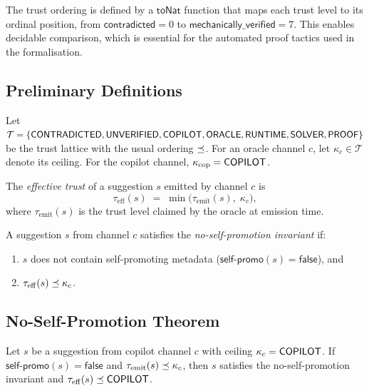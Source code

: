 \documentclass[11pt]{article}
\newcommand{\selfpromo}{\mathsf{self\text{-}promo}}
\begin{document}
The trust ordering is defined by a $\mathsf{toNat}$ function that
maps each trust level to its ordinal position, from
$\mathsf{contradicted} = 0$ to
$\mathsf{mechanically\_verified} = 7$.  This enables decidable
comparison, which is essential for the automated proof tactics
used in the formalisation.

\subsection{Preliminary Definitions}\label{sec:formal-prelim}

Let $\mathcal{T} = \{\mathsf{CONTRADICTED}, \mathsf{UNVERIFIED}, \mathsf{COPILOT}, \mathsf{ORACLE},
\mathsf{RUNTIME}, \mathsf{SOLVER}, \mathsf{PROOF}\}$ be the trust lattice with the
usual ordering $\preceq$.  For an oracle channel $c$, let
$\kappa_c \in \mathcal{T}$ denote its ceiling.  For the copilot
channel, $\kappa_{\mathrm{cop}} = \mathsf{COPILOT}$.

\begin{definition}\label{def:effective}
The \emph{effective trust} of a suggestion $s$ emitted by channel
$c$ is
\[
  \tau_{\mathrm{eff}}(s) \;=\;
  \min\bigl(\tau_{\mathrm{emit}}(s),\; \kappa_c\bigr),
\]
where $\tau_{\mathrm{emit}}(s)$ is the trust level claimed by the
oracle at emission time.
\end{definition}

\begin{definition}\label{def:nsp-inv}
A suggestion $s$ from channel $c$ satisfies the
\emph{no-self-promotion invariant} if:
\begin{enumerate}
  \item $s$ does not contain self-promoting metadata
    ($\selfpromo(s) = \mathsf{false}$), and
  \item $\tau_{\mathrm{eff}}(s) \preceq \kappa_c$.
\end{enumerate}
\end{definition}

\subsection{No-Self-Promotion Theorem}\label{sec:thm-nsp}

\begin{theorem}\label{thm:nsp}
Let $s$ be a suggestion from copilot channel $c$ with ceiling
$\kappa_c = \mathsf{COPILOT}$.  If $\selfpromo(s) = \mathsf{false}$ and
$\tau_{\mathrm{emit}}(s) \preceq \kappa_c$, then $s$ satisfies the
no-self-promotion invariant and
$\tau_{\mathrm{eff}}(s) \preceq \mathsf{COPILOT}$.
\end{theorem}
\end{document}
